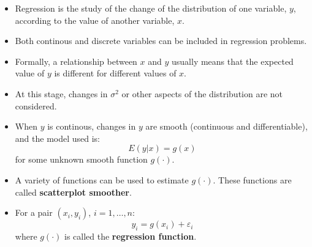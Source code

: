 

\begin{frame}
  \begin{itemize}
    \item Regression is the study of the change of the distribution of one variable, $ y $, according to the value of another variable, $ x $.
    \item Both continous and discrete variables can be included in regression problems.
    \item Formally, a relationship between $ x $ and $ y $ usually means that the expected value of $ y $ is different for different values of $ x $.
    \item At this stage, changes in $ \sigma^2 $ or other aspects of the distribution are not considered.
    \item When $ y $ is continous, changes in $ y $ are smooth (continuous and differentiable), and the model used is:
      $$ E(y|x) = g(x) $$
      for some unknown smooth function $ g(\cdot) $.
  \end{itemize}
\end{frame}




\begin{frame}
  \begin{itemize}
    \vspace{0.75cm}
    \item A variety of functions can be used to estimate $ g(\cdot) $. These functions are called \textbf{scatterplot smoother}.
    \vspace{1.25cm}
    \item For a pair $ (x_i, y_i) $, $ i = 1, \dots, n $:
      $$ y_i = g(x_i) + \varepsilon_i $$
      where $ g(\cdot) $ is called the \textbf{regression function}.
  \end{itemize}
\end{frame}




